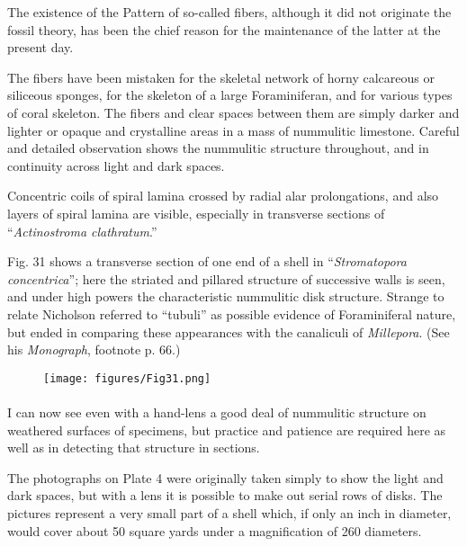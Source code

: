 \documentclass[a4paper, 12pt, oneside]{article}
\begin{document}
The existence of the Pattern of so-called fibers, although it did not originate the fossil theory, has been the chief reason for the maintenance of the latter at the present day.

The fibers have been mistaken for the skeletal network of horny calcareous or siliceous sponges, for the skeleton of a large Foraminiferan, and for various types of coral skeleton. The fibers and clear spaces between them are simply darker and lighter or opaque and crystalline areas in a mass of nummulitic limestone. Careful and detailed observation shows the nummulitic structure throughout, and in continuity across light and dark spaces.

Concentric coils of spiral lamina crossed by radial alar prolongations, and also layers of spiral lamina are visible, especially in transverse sections of ``\emph{Actinostroma clathratum}.''

Fig. 31 shows a transverse section of one end of a shell in ``\emph{Stromatopora concentrica}''; here the striated and pillared structure of successive walls is seen, and under high powers the characteristic nummulitic disk structure. Strange to relate Nicholson referred to ``tubuli'' as possible evidence of Foraminiferal nature, but ended in comparing these appearances with the canaliculi of \emph{Millepora}. (See his \emph{Monograph}, footnote p. 66.)
\begin{figure}[H]
\centering
\texttt{[image: figures/Fig31.png]}
\caption*{}
\end{figure}
\paragraph{}
I can now see even with a hand-lens a good deal of nummulitic structure on weathered surfaces of specimens, but practice and patience are required here as well as in detecting that structure in sections.

The photographs on Plate 4 were originally taken simply to show the light and dark spaces, but with a lens it is possible to make out serial rows of disks. The pictures represent a very small part of a shell which, if only an inch in diameter, would cover about 50 square yards under a magnification of 260 diameters.
\end{document}
